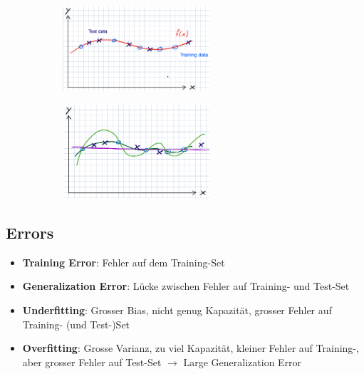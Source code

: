 \documentclass[a4paper]{article}
\begin{document}
		\begin{figure}[htb!]
			\centering
			\begin{subfigure}[b]{0.475\textwidth}
				\centering
				\includegraphics[width=0.6\textwidth]{img/06_deep_nn/capacity_01.png}
			\end{subfigure}
			\hfill
			\begin{subfigure}[b]{0.475\textwidth}
				\centering
				\includegraphics[width=0.6\textwidth]{img/06_deep_nn/capacity_02.png}
			\end{subfigure}
		\end{figure}
		
		\newpage
		
		\subsection{Errors}
		
		\begin{itemize}
			\item \textbf{Training Error}: Fehler auf dem Training-Set
			\item \textbf{Generalization Error}: Lücke zwischen Fehler auf Training- und Test-Set
			\item \textbf{Underfitting}: Grosser Bias, nicht genug Kapazität, grosser Fehler auf Training- (und Test-)Set
			\item \textbf{Overfitting}: Grosse Varianz, zu viel Kapazität, kleiner Fehler auf Training-, aber grosser Fehler auf Test-Set $\rightarrow$ Large Generalization Error
		\end{itemize}
	
\end{document}
